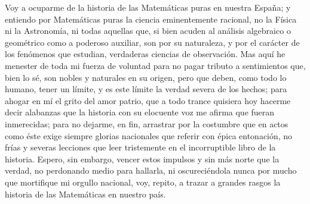 \documentclass[a4paper, 12pt]{article}
\begin{document}
Voy a ocuparme de la historia de las Matemáticas puras en nuestra España; y entiendo por Matemáticas puras la ciencia eminentemente racional, no la Física ni la Astronomía, ni todas aquellas que, si bien acuden al análisis algebraico o geométrico como a poderoso auxiliar, son por su naturaleza, y por el carácter de los fenómenos que estudian, verdaderas ciencias de observación.  Mas aquí he menester de toda mi fuerza de voluntad para no pagar tributo a sentimientos que, bien lo sé, son nobles y naturales en su origen, pero que deben, como todo lo humano, tener un límite, y es este límite la verdad severa de los hechos; para ahogar en mí el grito del amor patrio, que a todo trance quisiera hoy hacerme decir alabanzas que la historia con su elocuente voz me afirma que fueran inmerecidas; para no dejarme, en fin, arrastrar por la costumbre que en actos como éste exige siempre glorias nacionales que referir con épica entonación, no frías y severas lecciones que leer tristemente en el incorruptible libro de la historia.  Espero, sin embargo, vencer estos impulsos y sin más norte que la verdad, no perdonando medio para hallarla, ni oscureciéndola nunca por mucho que mortifique mi orgullo nacional, voy, repito, a trazar a grandes rasgos la historia de las Matemáticas en nuestro país.
\end{document}
